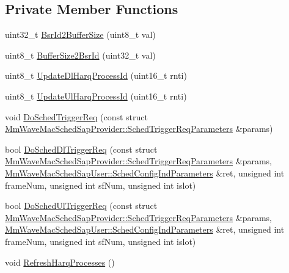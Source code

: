 \subsection*{Private Member Functions}
\begin{DoxyCompactItemize}
\item 
uint32\+\_\+t \hyperlink{classns3_1_1MmWaveRrMacScheduler_ad748b4ad6a90547493f1bfd4a95fa055}{Bsr\+Id2\+Buffer\+Size} (uint8\+\_\+t val)
\item 
uint8\+\_\+t \hyperlink{classns3_1_1MmWaveRrMacScheduler_a3186afb36a652a68908b932e2ceb2567}{Buffer\+Size2\+Bsr\+Id} (uint32\+\_\+t val)
\item 
uint8\+\_\+t \hyperlink{classns3_1_1MmWaveRrMacScheduler_a0c01cd018ece348fa17da5babacd3bae}{Update\+Dl\+Harq\+Process\+Id} (uint16\+\_\+t rnti)
\item 
uint8\+\_\+t \hyperlink{classns3_1_1MmWaveRrMacScheduler_addd7405298c9c95bf87ef2c32c3a477b}{Update\+Ul\+Harq\+Process\+Id} (uint16\+\_\+t rnti)
\item 
void \hyperlink{classns3_1_1MmWaveRrMacScheduler_a48f0e305c3d706ac557bcb877f6cd2d0}{Do\+Sched\+Trigger\+Req} (const struct \hyperlink{structns3_1_1MmWaveMacSchedSapProvider_1_1SchedTriggerReqParameters}{Mm\+Wave\+Mac\+Sched\+Sap\+Provider\+::\+Sched\+Trigger\+Req\+Parameters} \&params)
\item 
bool \hyperlink{classns3_1_1MmWaveRrMacScheduler_a17b839c05a05ce1ef83b9b806c943789}{Do\+Sched\+Dl\+Trigger\+Req} (const struct \hyperlink{structns3_1_1MmWaveMacSchedSapProvider_1_1SchedTriggerReqParameters}{Mm\+Wave\+Mac\+Sched\+Sap\+Provider\+::\+Sched\+Trigger\+Req\+Parameters} \&params, \hyperlink{structns3_1_1MmWaveMacSchedSapUser_1_1SchedConfigIndParameters}{Mm\+Wave\+Mac\+Sched\+Sap\+User\+::\+Sched\+Config\+Ind\+Parameters} \&ret, unsigned int frame\+Num, unsigned int sf\+Num, unsigned int islot)
\item 
bool \hyperlink{classns3_1_1MmWaveRrMacScheduler_a60261f8b46716986bd8d0ae245fab35a}{Do\+Sched\+Ul\+Trigger\+Req} (const struct \hyperlink{structns3_1_1MmWaveMacSchedSapProvider_1_1SchedTriggerReqParameters}{Mm\+Wave\+Mac\+Sched\+Sap\+Provider\+::\+Sched\+Trigger\+Req\+Parameters} \&params, \hyperlink{structns3_1_1MmWaveMacSchedSapUser_1_1SchedConfigIndParameters}{Mm\+Wave\+Mac\+Sched\+Sap\+User\+::\+Sched\+Config\+Ind\+Parameters} \&ret, unsigned int frame\+Num, unsigned int sf\+Num, unsigned int islot)
\item 
void \hyperlink{classns3_1_1MmWaveRrMacScheduler_a5b4fe59b80549148440a6e5f3e05f8e6}{Refresh\+Harq\+Processes} ()

\end{DoxyCompactItemize}
